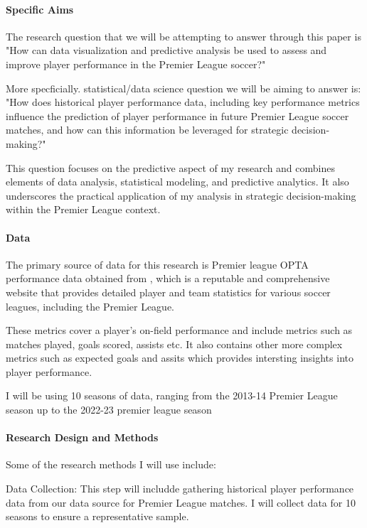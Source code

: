 \documentclass[12pt]{article}
\begin{document}
\paragraph{Specific Aims}

The research question that we will be attempting to answer through this paper is
"How can data visualization and predictive analysis be used to assess and 
improve player performance in the Premier League soccer?"

More specficially. statistical/data science question we will be aiming to answer
is: "How does historical player performance data, including key performance
metrics influence the prediction of player performance in future Premier League 
soccer matches, and how can this information be leveraged for strategic 
decision-making?"

This question focuses on the predictive aspect of my research and combines
elements of data analysis, statistical modeling, and predictive analytics. 
It also underscores the practical application of my analysis in strategic 
decision-making within the Premier League context.




\paragraph{Data}
The primary source of data for this research is Premier league OPTA performance 
data obtained from , which is a reputable and comprehensive website 
that provides detailed player and team statistics for various soccer leagues, 
including the Premier League.

These metrics cover a player's on-field performance and include metrics such as
matches played, goals scored, assists etc. It also contains other more complex 
metrics such as expected goals and assits which provides intersting insights
into player performance.

I will be using 10 seasons of data, ranging from the 2013-14 Premier League
season up to the 2022-23 premier league season 




\paragraph{Research Design and Methods}

Some of the research methods I will use include:

Data Collection:
This step will includde gathering historical player performance data from our 
data source for Premier League matches. I will collect data for 10 seasons to 
ensure a representative sample.
\end{document}

